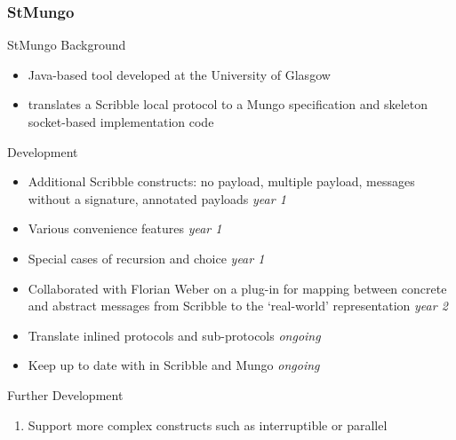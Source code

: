\begin{frame}[allowframebreaks]\frametitle{StMungo}

  \begin{alertblock}{StMungo Background}
  \begin{itemize}
    \item Java-based tool developed at the University of Glasgow
    \item translates a Scribble local protocol to a Mungo specification and skeleton socket-based implementation code
  \end{itemize}
\end{alertblock}


\begin{alertblock}{Development}
  \begin{itemize}
    \item Additional Scribble constructs: no payload, multiple payload, messages without a signature, annotated payloads \hfill  \textit{year 1}
    \item Various convenience features \hfill  \textit{year 1}
    \item Special cases of recursion and choice \hfill  \textit{year 1}
    \item Collaborated with Florian Weber on a plug-in for mapping between concrete and abstract messages from Scribble to the `real-world' representation
    \hfill  \textit{year 2}
    \item Translate inlined protocols and sub-protocols \hfill  \textit{ongoing}
    \item Keep up to date with in Scribble and Mungo \hfill  \textit{ongoing}

  \end{itemize}
\end{alertblock}

\begin{alertblock}{Further Development}
  \begin{enumerate}
    \item Support more complex constructs such as interruptible or parallel
\end{enumerate}

\end{alertblock}


\end{frame}
